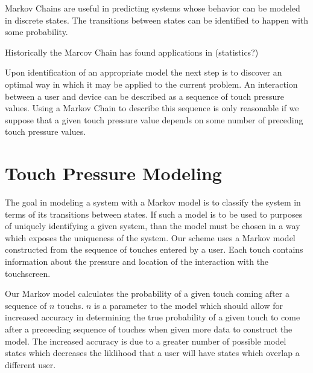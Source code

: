 \documentclass{acm_proc_article-sp}
\begin{document}
Markov Chains are useful in predicting systems whose behavior can be modeled in discrete states. The transitions between states can be identified to happen with some probability.

Historically the Marcov Chain has found applications in (statistics?)

Upon identification of an appropriate model the next step is to discover an optimal way in which it may be applied to the current problem. An interaction between a user and device can be described as a sequence of touch pressure values. Using a Markov Chain to describe this sequence is only reasonable if we suppose that a given touch pressure value depends on some number of preceding touch pressure values. \cite{marcov_chains_previous_n_values}
%

\section{Touch Pressure Modeling}
\label{touch_pressure_modeling}
The goal in modeling a system with a Markov model is to classify the system in terms of its transitions between states. If such a model is to be used to purposes of uniquely identifying a given system, than the model must be chosen in a way which exposes the uniqueness of the system. Our scheme uses a Markov model constructed from the sequence of touches entered by a user. Each touch contains information about the pressure and location of the interaction with the touchscreen.

Our Markov model calculates the probability of a given touch coming after a sequence of $n$ touchs. $n$ is a parameter to the model which should allow for increased accuracy in determining the true probability of a given touch to come after a preceeding sequence of touches when given more data to construct the model. The increased accuracy is due to a greater number of possible model states which decreases the liklihood that a user will have states which overlap a different user.
\end{document}
